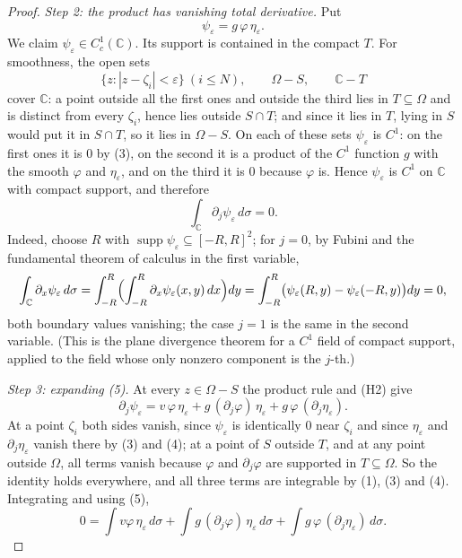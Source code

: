 \begin{proof}
\emph{Step 2: the product has vanishing total derivative.}  Put
\[
  \psi_\varepsilon=g\,\varphi\,\eta_\varepsilon .
\]
We claim $\psi_\varepsilon\in C^1_c(\mathbb{C})$.  Its support is contained in
the compact $T$.  For smoothness, the open sets
\[
  \{z:|z-\zeta_i|<\varepsilon\}\ (i\le N),\qquad \Omega-S,\qquad \mathbb{C}-T
\]
cover $\mathbb{C}$: a point outside all the first ones and outside the third
lies in $T\subseteq\Omega$ and is distinct from every $\zeta_i$, hence lies
outside $S\cap T$; and since it lies in $T$, lying in $S$ would put it in
$S\cap T$, so it lies in $\Omega-S$.  On each of these sets $\psi_\varepsilon$
is $C^1$: on the first ones it is $0$ by (3), on the second it is a product of
the $C^1$ function $g$ with the smooth $\varphi$ and $\eta_\varepsilon$, and on
the third it is $0$ because $\varphi$ is.  Hence $\psi_\varepsilon$ is $C^1$ on
$\mathbb{C}$ with compact support, and therefore
\begin{equation}\tag{5}
  \int_{\mathbb{C}}\partial_j\psi_\varepsilon\,d\sigma=0 .
\end{equation}
Indeed, choose $R$ with $\operatorname{supp}\psi_\varepsilon\subseteq[-R,R]^2$;
for $j=0$, by Fubini and the fundamental theorem of calculus in the first
variable,
\[
  \int_{\mathbb{C}}\partial_x\psi_\varepsilon\,d\sigma
  =\int_{-R}^{R}\Bigl(\int_{-R}^{R}\partial_x\psi_\varepsilon(x,y)\,dx\Bigr)dy
  =\int_{-R}^{R}\bigl(\psi_\varepsilon(R,y)-\psi_\varepsilon(-R,y)\bigr)dy=0,
\]
both boundary values vanishing; the case $j=1$ is the same in the second
variable.  (This is the plane divergence theorem for a $C^1$ field of compact
support, applied to the field whose only nonzero component is the $j$-th.)

\emph{Step 3: expanding (5).}  At every $z\in\Omega-S$ the product rule and
(H2) give
\[
  \partial_j\psi_\varepsilon
  =v\,\varphi\,\eta_\varepsilon+g\,(\partial_j\varphi)\,\eta_\varepsilon
    +g\,\varphi\,(\partial_j\eta_\varepsilon).
\]
At a point $\zeta_i$ both sides vanish, since $\psi_\varepsilon$ is identically
$0$ near $\zeta_i$ and since $\eta_\varepsilon$ and $\partial_j\eta_\varepsilon$
vanish there by (3) and (4); at a point of $S$ outside $T$, and at any point
outside $\Omega$, all terms vanish because $\varphi$ and $\partial_j\varphi$ are
supported in $T\subseteq\Omega$.  So the identity holds everywhere, and all
three terms are integrable by (1), (3) and (4).  Integrating and using (5),
\begin{equation}\tag{6}
  0=\int v\varphi\,\eta_\varepsilon\,d\sigma
   +\int g\,(\partial_j\varphi)\,\eta_\varepsilon\,d\sigma
   +\int g\,\varphi\,(\partial_j\eta_\varepsilon)\,d\sigma .
\end{equation}


\end{proof}
